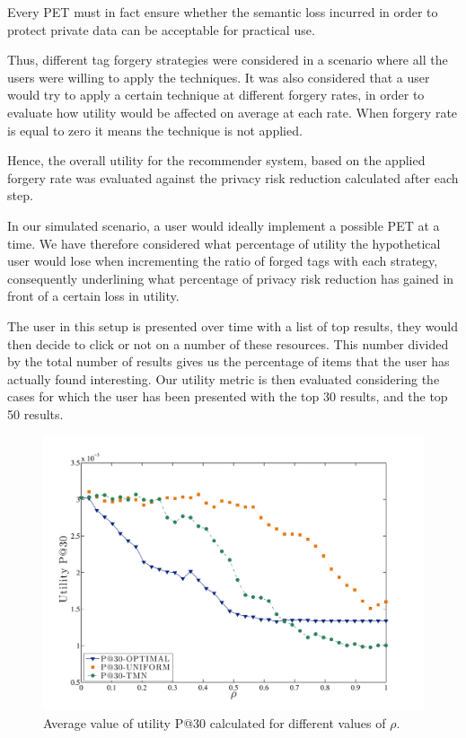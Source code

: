 Every PET must in fact ensure whether the semantic loss incurred in order to protect private data can be acceptable for practical use.

Thus, different tag forgery strategies were considered in a scenario where all the users were willing to apply the techniques. It was also considered that a user would try to apply a certain technique at different forgery rates, in order to evaluate how utility would be affected on average at each rate. When forgery rate is equal to zero it means the technique is not applied.

Hence, the overall utility for the recommender system, based on the applied forgery rate was evaluated against the privacy risk reduction calculated after each step.

In our simulated scenario, a user would ideally implement a possible PET at a time. We have therefore considered what percentage of utility the hypothetical user would lose when incrementing the ratio of forged tags with each strategy, consequently underlining what percentage of privacy risk reduction has gained in front of a certain loss in utility.

The user in this setup is presented over time with a list of top results, they would then decide to click or not on a number of these resources. This number divided by the total number of results gives us the percentage of items that the user has actually found interesting. Our utility metric is then evaluated considering the cases for which the user has been presented with the top 30 results, and the top 50 results.

\begin{figure}[htb]  
\includegraphics[width=\textwidth]{figures/Fig5a.pdf}
\caption[Utility measurement P@30.]{Average value of utility P@30 calculated for different values of $\rho$.}
\label{fig:P30-Rho}
\end{figure}

